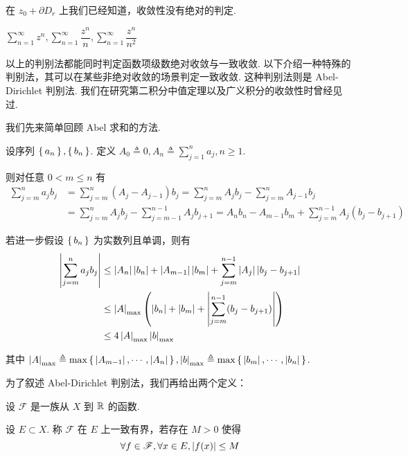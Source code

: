 \begin{hint}
    在 $z_0+\partial D_r$ 上我们已经知道，收敛性没有绝对的判定.
\end{hint}

\begin{example}
    $\sum\limits_{n=1}^\infty z^n,\sum\limits_{n=1}^\infty\dfrac{z^n}{n},\sum\limits_{n=1}^\infty\dfrac{z^n}{n^2}$
\end{example}


以上的判别法都能同时判定函数项级数绝对收敛与一致收敛. 以下介绍一种特殊的判别法，其可以在某些非绝对收敛的场景判定一致收敛. 这种判别法则是 Abel-Dirichlet 判别法. 我们在研究第二积分中值定理以及广义积分的收敛性时曾经见过.

我们先来简单回顾 Abel 求和的方法.

设序列 $\set{a_n},\set{b_n}$. 定义 $A_0\triangleq 0,A_n\triangleq\sum\limits_{j=1}^na_j,n\ge 1$.

则对任意 $0<m\le n$ 有
$$
\begin{aligned}
    \sum_{j=m}^na_jb_j&=\sum_{j=m}^n(A_j-A_{j-1})b_j=\sum_{j=m}^nA_jb_j-\sum_{j=m}^nA_{j-1}b_j\\
    &=\sum_{j=m}^nA_jb_j-\sum_{j=m-1}^{n-1}A_jb_{j+1}=A_nb_n-A_{m-1}b_m+\sum_{j=m}^{n-1}A_j(b_j-b_{j+1})
\end{aligned}
$$

若进一步假设 $\set{b_n}$ 为实数列且单调，则有
$$
\begin{aligned}
    \left\lvert{\sum_{j=m}^na_jb_j}\right\rvert&\le\left\lvert{A_n}\right\rvert\left\lvert{b_n}\right\rvert+\left\lvert{A_{m-1}}\right\rvert\left\lvert{b_m}\right\rvert+\sum_{j=m}^{n-1}\left\lvert{A_j}\right\rvert\left\lvert{b_j-b_{j+1}}\right\rvert\\
    &\le\left\lvert{A}\right\rvert_\textrm{max}\left(\left\lvert{b_n}\right\rvert+\left\lvert{b_m}\right\rvert+\left\lvert{\sum_{j=m}^{n-1}(b_j-b_{j+1})}\right\rvert\right)\\
    &\le 4\left\lvert{A}\right\rvert_\textrm{max}\left\lvert{b}\right\rvert_\textrm{max}
\end{aligned}
$$

其中 $\left\lvert{A}\right\rvert_\textrm{max}\triangleq\max\set{\left\lvert{A_{m-1}}\right\rvert,\cdots,\left\lvert{A_n}\right\rvert},\left\lvert{b}\right\rvert_\textrm{max}\triangleq\max\set{\left\lvert{b_m}\right\rvert,\cdots,\left\lvert{b_n}\right\rvert}$.

为了叙述 Abel-Dirichlet 判别法，我们再给出两个定义：

\begin{definition}
    设 $\mathscr{F}$ 是一族从 $X$ 到 $\mathbb{R}$ 的函数.
    
    设 $E\subset X$. 称 $\mathscr{F}$ 在 $E$ 上一致有界，若存在 $M>0$ 使得
$$
\forall f\in\mathscr{F},\forall x\in E,\left\lvert{f(x)}\right\rvert\le M
$$
\end{definition}

